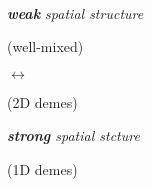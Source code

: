 \begin{figure}[h]
  \captionsetup[subfigure]{justification=raggedright}
  \begin{minipage}{\textwidth}

    \begin{minipage}{0.1\textwidth}~\end{minipage}%
    \begin{minipage}{0.25\textwidth}
      \centering
      \itshape
      {\large
      \textbf{weak} spatial structure
      }

      (well-mixed)
    \end{minipage}%
    \begin{minipage}{0.25\textwidth}
      \centering
      \itshape
      {\huge
      $\longleftrightarrow$
      }
      
      (2D demes)
    \end{minipage}%
    \begin{minipage}{0.25\textwidth}
      \centering
      \itshape
      {\large
      \textbf{strong} spatial stcture
      }

      (1D demes)
    \end{minipage}

    ~\vspace{-0.7ex}


\end{minipage}
\end{figure}

